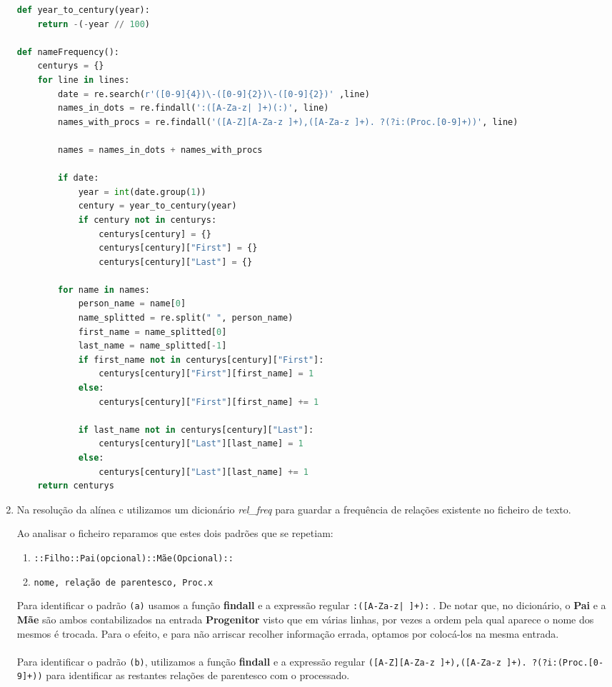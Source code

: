 \documentclass[11pt,a4paper]{report}
\begin{document}
\begin{enumerate}[label=\alph*.]
        \begin{lstlisting}[language=Python]
def year_to_century(year):
    return -(-year // 100)

def nameFrequency():
    centurys = {}
    for line in lines:
        date = re.search(r'([0-9]{4})\-([0-9]{2})\-([0-9]{2})' ,line)
        names_in_dots = re.findall(':([A-Za-z| ]+)(:)', line)
        names_with_procs = re.findall('([A-Z][A-Za-z ]+),([A-Za-z ]+). ?(?i:(Proc.[0-9]+))', line)
 
        names = names_in_dots + names_with_procs
    
        if date:
            year = int(date.group(1))
            century = year_to_century(year)
            if century not in centurys:
                centurys[century] = {}
                centurys[century]["First"] = {}
                centurys[century]["Last"] = {}

        for name in names:
            person_name = name[0] 
            name_splitted = re.split(" ", person_name)
            first_name = name_splitted[0]
            last_name = name_splitted[-1]
            if first_name not in centurys[century]["First"]:
                centurys[century]["First"][first_name] = 1
            else:
                centurys[century]["First"][first_name] += 1

            if last_name not in centurys[century]["Last"]:
                centurys[century]["Last"][last_name] = 1
            else:
                centurys[century]["Last"][last_name] += 1
    return centurys
        \end{lstlisting}

        \item Na resolução da alínea c utilizamos um dicionário \textit{rel\_freq} para guardar a frequência de relações existente no ficheiro de texto. 
        
        Ao analisar o ficheiro reparamos que estes dois padrões que se repetiam:\\
        \begin{enumerate}
            \item \texttt{::Filho::Pai(opcional)::Mãe(Opcional)::}\\
            \item \texttt{nome, relação de parentesco, Proc.x} \\
        \end{enumerate}

        Para identificar o padrão \texttt{(a)} usamos a função \textbf{findall} e a expressão regular \texttt{:([A-Za-z| ]+):} . De notar que, no dicionário, o \textbf{Pai} e a \textbf{Mãe} são ambos contabilizados na entrada \textbf{Progenitor} visto que em várias linhas, por vezes a ordem pela qual aparece o nome dos mesmos é trocada. Para o efeito, e para não arriscar recolher informação errada, optamos por colocá-los na mesma entrada. \\
        \\
        Para identificar o padrão \texttt{(b)}, utilizamos a função \textbf{findall} e a expressão regular \texttt{([A-Z][A-Za-z ]+),([A-Za-z ]+). ?(?i:(Proc.[0-9]+))} para identificar as restantes relações de parentesco com o processado.
    

\end{enumerate}
\end{document}
